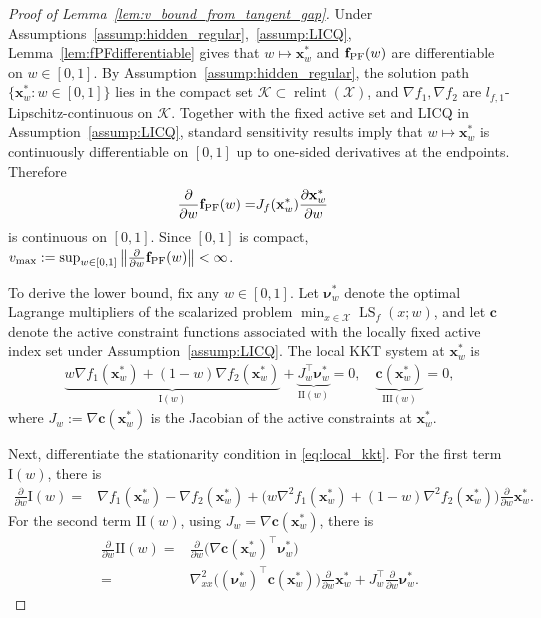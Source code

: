 \documentclass{article}
\newcommand{\bx}{\mathbf{x}}
\newcommand{\X}{\mathcal{X}}
\newcommand{\LS}{\operatorname{LS}}
\newcommand{\fPF}{{\mathbf{f}_{\rm PF}}}
\begin{document}
\begin{proof}[Proof of Lemma~\ref{lem:v_bound_from_tangent_gap}]
Under Assumptions~\ref{assump:hidden_regular},~\ref{assump:LICQ}, Lemma~\ref{lem:fPFdifferentiable} gives that $w\mapsto \bx_w^*$ and $\fPF(w)$ are differentiable on $w\in[0,1]$. By Assumption~\ref{assump:hidden_regular}, the solution path $\{\bx_w^*:w\in[0,1]\}$ lies in the compact set $\mathcal K\subset \operatorname{relint}(\mathcal X)$, and $\nabla f_1,\nabla f_2$ are $l_{f,1}$-Lipschitz-continuous on $\mathcal K$. Together with the fixed active set and LICQ in Assumption~\ref{assump:LICQ}, standard sensitivity results imply that $w\mapsto \bx_w^*$ is continuously differentiable on $[0,1]$ up to one-sided derivatives at the endpoints. Therefore
\begin{align}
\frac{\partial}{\partial w}\fPF(w)
= & J_f(\bx_w^*) \frac{\partial \bx_w^*}{\partial w}
\end{align}
is continuous on $[0,1]$. Since $[0,1]$ is compact, $v_{\max}:=\sup_{w\in[0,1]}\left\|\frac{\partial}{\partial w}\fPF(w)\right\|<\infty$.

To derive the lower bound, fix any $w\in[0,1]$. Let $\boldsymbol{\nu}_w^*$ denote the optimal Lagrange multipliers of the scalarized problem $\min_{x\in\X}\LS_f(x;w)$, and let $\mathbf c$ denote the active constraint functions associated with the locally fixed active index set under Assumption~\ref{assump:LICQ}. The local KKT system at $\bx_w^*$ is
\begin{align}
\underbrace{w \nabla f_1(\bx_w^*) + (1-w)\nabla f_2(\bx_w^*)}_{\mathrm{I}(w)} + \underbrace{J_w^\top \boldsymbol{\nu}_w^*}_{\mathrm{II}(w)} = 0,\quad \underbrace{\mathbf c(\bx_w^*)}_{\mathrm{III}(w)} = 0,
\label{eq:local_kkt}
\end{align}
where $J_w := \nabla \mathbf c(\bx_w^*)$ is the Jacobian of the active constraints at $\bx_w^*$.

Next, differentiate the stationarity condition in \eqref{eq:local_kkt}. For the first term $\mathrm{I}(w)$, there is
\begin{align}
\frac{\partial}{\partial w} \mathrm{I}(w)
= & \nabla f_1(\bx_w^*)-\nabla f_2(\bx_w^*)+\big(w\nabla^2 f_1(\bx_w^*) + (1-w)\nabla^2 f_2(\bx_w^*)\big)\frac{\partial}{\partial w}\bx_w^*.
\end{align}
For the second term $\mathrm{II}(w)$, using $J_w=\nabla \mathbf c(\bx_w^*)$, there is
\begin{align}
\frac{\partial}{\partial w}\mathrm{II}(w)
= & \frac{\partial}{\partial w}\big(\nabla \mathbf c(\bx_w^*)^\top \boldsymbol{\nu}_w^*\big) \nonumber\\
= & \nabla_{xx}^2 \big((\boldsymbol{\nu}_w^*)^\top \mathbf c(\bx_w^*)\big)\frac{\partial}{\partial w}\bx_w^*+J_w^\top \frac{\partial}{\partial w}\boldsymbol{\nu}_w^*.
\end{align}


\end{proof}
\end{document}
